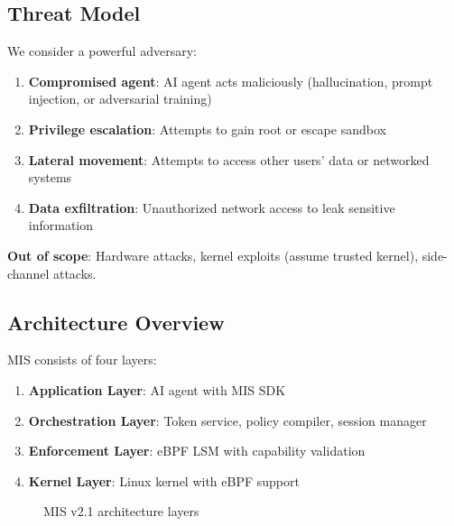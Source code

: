 \documentclass[11pt,a4paper]{article}
\begin{document}
\subsection{Threat Model}

We consider a powerful adversary:

\begin{enumerate}
    \item \textbf{Compromised agent}: AI agent acts maliciously (hallucination, prompt injection, or adversarial training)
    \item \textbf{Privilege escalation}: Attempts to gain root or escape sandbox
    \item \textbf{Lateral movement}: Attempts to access other users' data or networked systems
    \item \textbf{Data exfiltration}: Unauthorized network access to leak sensitive information
\end{enumerate}

\textbf{Out of scope}: Hardware attacks, kernel exploits (assume trusted kernel), side-channel attacks.

\subsection{Architecture Overview}

MIS consists of four layers:

\begin{enumerate}
    \item \textbf{Application Layer}: AI agent with MIS SDK
    \item \textbf{Orchestration Layer}: Token service, policy compiler, session manager
    \item \textbf{Enforcement Layer}: eBPF LSM with capability validation
    \item \textbf{Kernel Layer}: Linux kernel with eBPF support
\end{enumerate}

\begin{figure}[ht]
\centering
{}
\caption{MIS v2.1 architecture layers}
\label{fig:architecture}
\end{figure}
\end{document}
